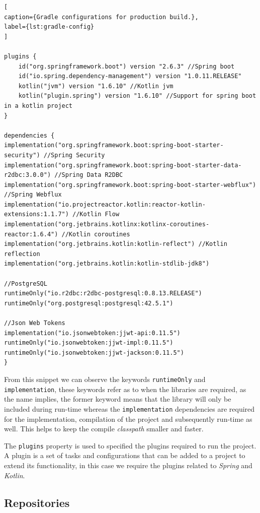 \begin{lstlisting}[
caption={Gradle configurations for production build.},
label={lst:gradle-config}
]

plugins {
	id("org.springframework.boot") version "2.6.3" //Spring boot
	id("io.spring.dependency-management") version "1.0.11.RELEASE" 
	kotlin("jvm") version "1.6.10" //Kotlin jvm
	kotlin("plugin.spring") version "1.6.10" //Support for spring boot in a kotlin project 
}

dependencies {
implementation("org.springframework.boot:spring-boot-starter-security") //Spring Security
implementation("org.springframework.boot:spring-boot-starter-data-r2dbc:3.0.0") //Spring Data R2DBC
implementation("org.springframework.boot:spring-boot-starter-webflux") //Spring Webflux
implementation("io.projectreactor.kotlin:reactor-kotlin-extensions:1.1.7") //Kotlin Flow
implementation("org.jetbrains.kotlinx:kotlinx-coroutines-reactor:1.6.4") //Kotlin coroutines
implementation("org.jetbrains.kotlin:kotlin-reflect") //Kotlin reflection
implementation("org.jetbrains.kotlin:kotlin-stdlib-jdk8")

//PostgreSQL
runtimeOnly("io.r2dbc:r2dbc-postgresql:0.8.13.RELEASE")
runtimeOnly("org.postgresql:postgresql:42.5.1")

//Json Web Tokens
implementation("io.jsonwebtoken:jjwt-api:0.11.5")
runtimeOnly("io.jsonwebtoken:jjwt-impl:0.11.5")
runtimeOnly("io.jsonwebtoken:jjwt-jackson:0.11.5")
}
\end{lstlisting}

From this snippet we can observe the keywords \lstinline{runtimeOnly} and \lstinline{implementation}, these keywords refer as to when the libraries are required, as the name implies, the former keyword means that the library will only be included during run-time whereas the \lstinline{implementation} dependencies are required for the implementation, compilation of the project and subsequently run-time as well.
This helps to keep the compile \textit{classpath} smaller and faster.

The \lstinline{plugins} property is used to specified the plugins required to run the project. A plugin is a set of tasks and configurations that can be added to a project to extend its functionality, in this case we require the plugins related to \textit{Spring} and \textit{Kotlin}.


\subsection{Repositories}\label{ch:impl:sec:be:subsec:repositories}

